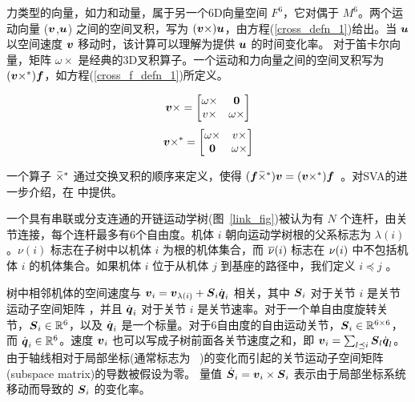 \documentclass[letterpaper, 10 pt, conference]{ieeetran}  %
\begin{document}

力类型的向量，如力和动量，属于另一个6D向量空间 $F^{6}$，它对偶于 $M^{6}$。两个运动向量 ($\boldsymbol{v}$,$\boldsymbol{u}$) 之间的空间叉积，写为 $(\boldsymbol{v} \times) \boldsymbol{u}$，由方程(\ref{cross_defn_1})给出。当 $\boldsymbol{u}$ 以空间速度 $\boldsymbol{v}$ 移动时，该计算可以理解为提供 $\boldsymbol{u}$ 的时间变化率。 %
对于笛卡尔向量，矩阵 $\omega \times$ 是经典的3D叉积算子。一个运动和力向量之间的空间叉积写为 $(\boldsymbol{v} \times^*) \boldsymbol{f}$，如方程(\ref{cross_f_defn_1})所定义。
\begin{multicols}{2}
  \begin{align}
    \v \times = \begin{bmatrix}
        \omega \times & \bf{0}  \\
       v \times &  \omega \times
    \end{bmatrix}
    \label{cross_defn_1}
\end{align}
  \begin{align}
    \v \times^* = \begin{bmatrix}
        \omega \times & v \times  \\
        \bf{0} &  \omega \times
    \end{bmatrix}
    \label{cross_f_defn_1}
\end{align}
\end{multicols}
\vspace{-1.5ex}
\noindent 一个算子 $\,\overline{\!\times\!}{}^{\,*}$ 通过交换叉积的顺序来定义，使得 $(\boldsymbol{f} \,\overline{\!\times\!}{}^{\,*}) \boldsymbol{v} = (\boldsymbol{v} \times^*) \boldsymbol{f}$~\cite{eche}。对SVA的进一步介绍，在 中提供。

\vspace{1ex}
 一个具有串联或分支连通的开链运动学树(图~\ref{link_fig})被认为有 $N$ 个连杆，由关节连接，每个连杆最多有6个自由度。机体 $i$ 朝向运动学树根的父系标志为 $\lambda(i)$。$\nu(i)$ 标志在子树中以机体 $i$ 为根的机体集合，而 $\overline{\nu}(i)$ 标志在 $\nu(i)$ 中不包括机体 $i$ 的机体集合。如果机体 $i$ 位于从机体 $j$ 到基座的路径中，我们定义 $i \preceq j$ 。

树中相邻机体的空间速度与 $\boldsymbol{v}_{i} = \boldsymbol{v}_{\lambda(i)} + \boldsymbol{S}_{i} \dot{\boldsymbol{q}}_{i}$ 相关，其中 $\boldsymbol{S}_{i}$ 对于关节 $i$ 是关节运动子空间矩阵 \cite{rbd}，并且 $\dot{\boldsymbol{q}}_{i}$ 对于关节 $i$ 是关节速率。对于一个单自由度旋转关节，$\boldsymbol{S}_{i} \in \mathbb{R}^{6}$，以及 $\dot{\boldsymbol{q}}_{i}$ 是一个标量。对于6自由度的自由运动关节，$\boldsymbol{S}_{i} \in \mathbb{R}^{6 \times 6}$，而 $\dot{\boldsymbol{q}}_{i} \in \mathbb{R}^{6}$。速度 $\boldsymbol{v}_{i}$ 也可以写成子树前面各关节速度之和，即 $\boldsymbol{v}_{i} = \sum_{l \preceq i} {\color{black}\boldsymbol{S}_{l}} \dot{\boldsymbol{q}}_{l}$。
 由于轴线相对于局部坐标(通常标志为 ~\cite{rbd})的变化而引起的关节运动子空间矩阵(subspace matrix)的导数被假设为零。
量值 ${\color{black}\,\dot{\!\boldsymbol{S}}{}_{i}} = \boldsymbol{v}_{i} \times {\color{black}\boldsymbol{S}_{i}}$ 表示由于局部坐标系统移动而导致的 $\boldsymbol{S}_{i}$ 的变化率。
\end{document}
